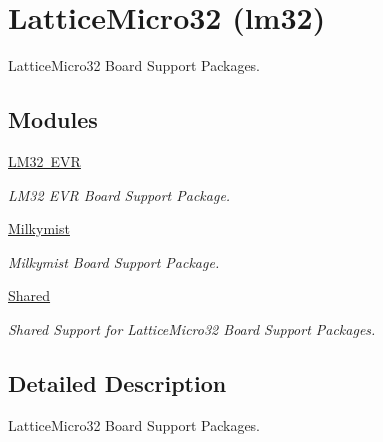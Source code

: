 \hypertarget{group__RTEMSBSPsLM32}{}\section{Lattice\+Micro32 (lm32)}
\label{group__RTEMSBSPsLM32}


Lattice\+Micro32 Board Support Packages.  


\subsection*{Modules}
\begin{DoxyCompactItemize}
\item 
\mbox{\hyperlink{group__RTEMSBSPsLM32EVR}{L\+M32 E\+VR}}
\begin{DoxyCompactList}\small\item\em L\+M32 E\+VR Board Support Package. \end{DoxyCompactList}\item 
\mbox{\hyperlink{group__RTEMSBSPsLM32Milkymist}{Milkymist}}
\begin{DoxyCompactList}\small\item\em Milkymist Board Support Package. \end{DoxyCompactList}\item 
\mbox{\hyperlink{group__RTEMSBSPsLM32Shared}{Shared}}
\begin{DoxyCompactList}\small\item\em Shared Support for Lattice\+Micro32 Board Support Packages. \end{DoxyCompactList}\end{DoxyCompactItemize}


\subsection{Detailed Description}
Lattice\+Micro32 Board Support Packages. 

